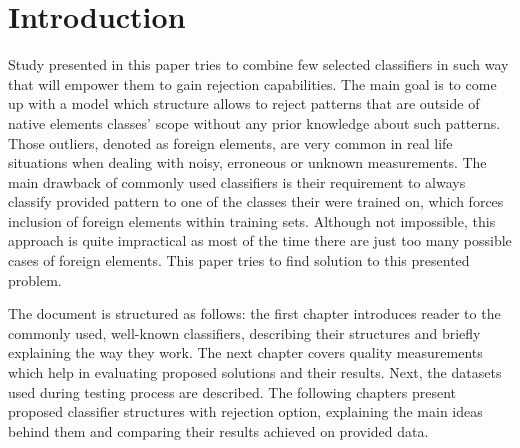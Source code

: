 \chapter{Introduction}

Study presented in this paper tries to combine few selected classifiers in such way that will empower them to gain rejection capabilities. The main goal is to come up with a model which structure allows to reject patterns that are outside of native elements classes' scope without any prior knowledge about such patterns. Those outliers, denoted as foreign elements, are very common in real life situations when dealing with noisy, erroneous or unknown measurements. The main drawback of commonly used classifiers is their requirement to always classify provided pattern to one of the classes their were trained on, which forces inclusion of foreign elements within training sets. Although not impossible, this approach is quite impractical as most of the time there are just too many possible cases of foreign elements. This paper tries to find solution to this presented problem.

The document is structured as follows: the first chapter introduces reader to the commonly used, well-known classifiers, describing their structures and briefly explaining the way they work. The next chapter covers quality measurements which help in evaluating proposed solutions and their results. Next, the datasets used during testing process are described. The following chapters present proposed classifier structures with rejection option, explaining the main ideas behind them and comparing their results achieved on provided data. 

